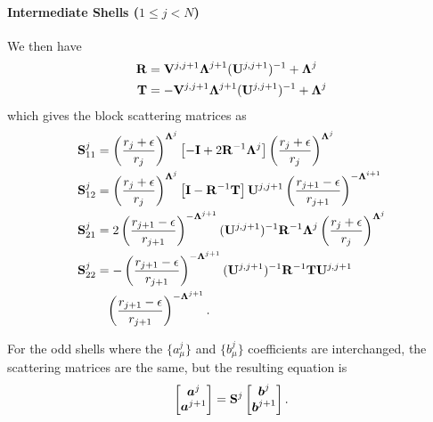 \paragraph{Intermediate Shells  ($1\leq j < N$)}
We then have
  \begin{subequations}
  \begin{align}
   \mathbf{R}	&= \mathbf{V}^{j,j+1}\boldsymbol{\Lambda}^{j+1}(\mathbf{U}^{j,j+1})^{-1}+\boldsymbol{\Lambda}^j	\\
   \mathbf{T}	&= -\mathbf{V}^{j,j+1}\boldsymbol{\Lambda}^{j+1}(\mathbf{U}^{j,j+1})^{-1}+\boldsymbol{\Lambda}^j
  \end{align}
  \end{subequations}
which gives the block scattering matrices as
  \begin{subequations}
  \begin{align}
   \mathbf{S}^j_{11}	&= \left(\frac{r_j+\epsilon}{r_j}\right)^{\boldsymbol{\Lambda}^j}\left[-\mathbf{I}+2\mathbf{R}^{-1}\boldsymbol{\Lambda}^j\right]\left(\frac{r_j+\epsilon}{r_j}\right)^{\boldsymbol{\Lambda}^j}	\\
   \mathbf{S}^j_{12}	&= \left(\frac{r_j+\epsilon}{r_j}\right)^{\boldsymbol{\Lambda}^j}\left[\mathbf{I}-\mathbf{R}^{-1}\mathbf{T}\right]\mathbf{U}^{j,j+1}\left(\frac{r_{j+1}-\epsilon}{r_{j+1}}\right)^{-\boldsymbol{\Lambda}^{i+1}}	\\
   \mathbf{S}^j_{21}	&= 2\left(\frac{r_{j+1}-\epsilon}{r_{j+1}}\right)^{-\boldsymbol{\Lambda}^{j+1}}(\mathbf{U}^{j,j+1})^{-1}\mathbf{R}^{-1}\boldsymbol{\Lambda}^j\left(\frac{r_j+\epsilon}{r_j}\right)^{\boldsymbol{\Lambda}^j}	\\
   \mathbf{S}^j_{22}	&= -\left(\frac{r_{j+1}-\epsilon}{r_{j+1}}\right)^{-\boldsymbol{\Lambda}^{j+1}}(\mathbf{U}^{j,j+1})^{-1}\mathbf{R}^{-1}\mathbf{T}\mathbf{U}^{j,j+1}\nonumber\\
			&\phantom{=}\left(\frac{r_{j+1}-\epsilon}{r_{j+1}}\right)^{-\boldsymbol{\Lambda}^{j+1}}.
  \end{align}
  \end{subequations}

For the odd shells where the $\{a_\mu^j\}$ and $\{b_\mu^j\}$ coefficients are interchanged, 
the scattering matrices are the same, but the resulting equation is
  \begin{equation}
    \begin{bmatrix} \boldsymbol{a}^j \\ \boldsymbol{a}^{j+1} \end{bmatrix} = \mathbf{S}^j \begin{bmatrix} \boldsymbol{b}^j \\ \boldsymbol{b}^{j+1} \end{bmatrix}.
  \end{equation}

